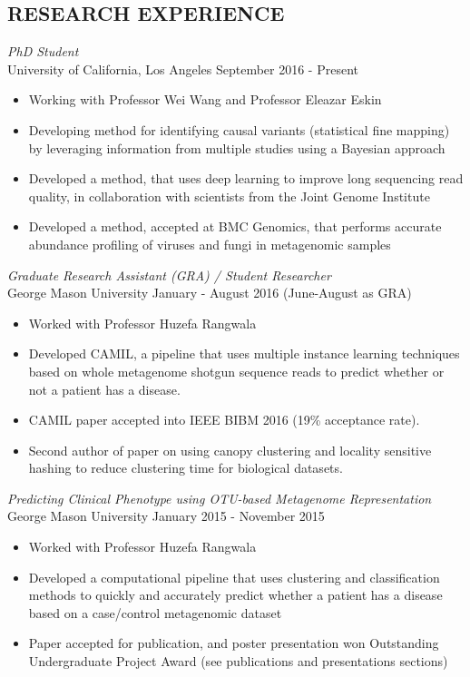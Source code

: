 \documentclass[margin, 10pt]{res} %
\begin{document}
\begin{resume}

\section{RESEARCH EXPERIENCE}

{\sl PhD Student} \\
University of California, Los Angeles \hfill September 2016 - Present
\begin{itemize} \itemsep -2pt %
\item Working with Professor Wei Wang and Professor Eleazar Eskin
\item Developing method for identifying causal variants (statistical fine mapping) by leveraging information from multiple studies using a Bayesian approach 
\item Developed a method, that uses deep learning to improve long sequencing read quality, in collaboration with scientists from the Joint Genome Institute
\item Developed a method, accepted at BMC Genomics, that performs accurate abundance profiling of viruses and fungi in metagenomic samples
\end{itemize}

{\sl Graduate Research Assistant (GRA) / Student Researcher} \\
George Mason University \hfill January - August 2016 (June-August as GRA)
\begin{itemize} \itemsep -2pt %
\item Worked with Professor Huzefa Rangwala 
\item Developed CAMIL, a pipeline that uses multiple instance learning techniques based on whole metagenome shotgun sequence reads to predict whether or not a patient has a disease.
\item CAMIL paper accepted into IEEE BIBM 2016 (19\% acceptance rate).
\item Second author of paper on using canopy clustering and locality sensitive hashing to reduce clustering time for biological datasets.
\end{itemize}

{\sl Predicting Clinical Phenotype using OTU-based Metagenome Representation} \\
George Mason University  \hfill January 2015 - November 2015
\begin{itemize} \itemsep -2pt %
\item Worked with Professor Huzefa Rangwala
\item Developed a computational pipeline that uses clustering and classification methods to quickly and accurately predict whether a patient has a disease based on a case/control metagenomic dataset
\item Paper accepted for publication, and poster presentation won Outstanding Undergraduate Project Award (see publications and presentations sections)
\end{itemize}


\end{resume}
\end{document}
